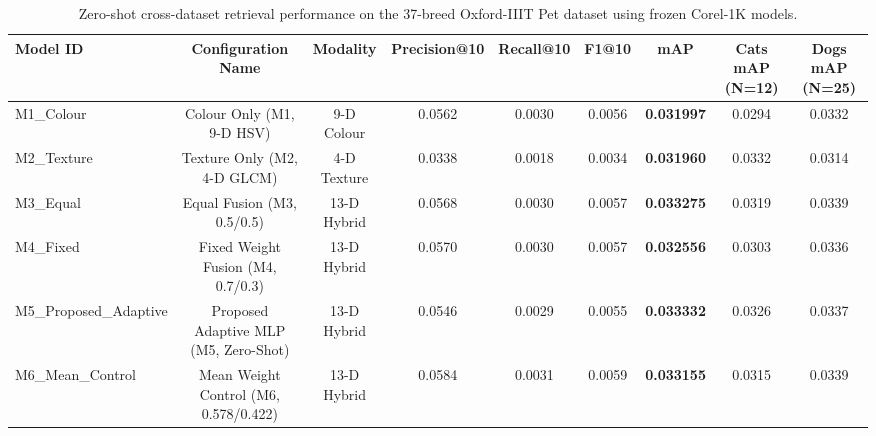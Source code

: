\begin{table}[!t]
\centering
\caption{Zero-shot cross-dataset retrieval performance on the 37-breed Oxford-IIIT Pet dataset using frozen Corel-1K models.}
\label{tab:oxford_transfer}
\begin{tabular}{lcccccccc}
\toprule
\textbf{Model ID} & \textbf{Configuration Name} & \textbf{Modality} & \textbf{Precision@10} & \textbf{Recall@10} & \textbf{F1@10} & \textbf{mAP} & \textbf{Cats mAP (N=12)} & \textbf{Dogs mAP (N=25)} \\
\midrule
M1_Colour & Colour Only (M1, 9-D HSV) & 9-D Colour & 0.0562 & 0.0030 & 0.0056 & \textbf{0.031997} & 0.0294 & 0.0332 \\
M2_Texture & Texture Only (M2, 4-D GLCM) & 4-D Texture & 0.0338 & 0.0018 & 0.0034 & \textbf{0.031960} & 0.0332 & 0.0314 \\
M3_Equal & Equal Fusion (M3, 0.5/0.5) & 13-D Hybrid & 0.0568 & 0.0030 & 0.0057 & \textbf{0.033275} & 0.0319 & 0.0339 \\
M4_Fixed & Fixed Weight Fusion (M4, 0.7/0.3) & 13-D Hybrid & 0.0570 & 0.0030 & 0.0057 & \textbf{0.032556} & 0.0303 & 0.0336 \\
M5_Proposed_Adaptive & Proposed Adaptive MLP (M5, Zero-Shot) & 13-D Hybrid & 0.0546 & 0.0029 & 0.0055 & \textbf{0.033332} & 0.0326 & 0.0337 \\
M6_Mean_Control & Mean Weight Control (M6, 0.578/0.422) & 13-D Hybrid & 0.0584 & 0.0031 & 0.0059 & \textbf{0.033155} & 0.0315 & 0.0339 \\
\bottomrule
\end{tabular}
\end{table}